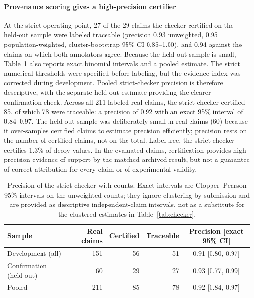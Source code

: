 \documentclass[preprint,12pt,authoryear]{elsarticle}
\begin{document}
\paragraph{Provenance scoring gives a high-precision certifier} At the strict operating point, 27 of the 29 claims the checker certified on the held-out sample were labeled traceable (precision 0.93 unweighted, 0.95 population-weighted, cluster-bootstrap 95\% CI 0.85--1.00), and 0.94 against the claims on which both annotators agree. Because the held-out sample is small, Table~\ref{tab:precision} also reports exact binomial intervals and a pooled estimate. The strict numerical thresholds were specified before labeling, but the evidence index was corrected during development. Pooled strict-checker precision is therefore descriptive, with the separate held-out estimate providing the clearer confirmation check. Across all 211 labeled real claims, the strict checker certified 85, of which 78 were traceable: a precision of 0.92 with an exact 95\% interval of 0.84--0.97. The held-out sample was deliberately small in real claims (60) because it over-samples certified claims to estimate precision efficiently; precision rests on the number of certified claims, not on the total. Label-free, the strict checker certifies 1.3\% of decoy values. In the evaluated claims, certification provides high-precision evidence of support by the matched archived result, but not a guarantee of correct attribution for every claim or of experimental validity.

\begin{table}[t]
\centering
\caption{Precision of the strict checker with counts. Exact intervals are Clopper--Pearson 95\% intervals on the unweighted counts; they ignore clustering by submission and are provided as descriptive independent-claim intervals, not as a substitute for the clustered estimates in Table~\ref{tab:checker}.}
\label{tab:precision}
\footnotesize
\begin{tabular}{@{}lrrrc@{}}
\toprule
Sample & Real claims & Certified & Traceable & Precision [exact 95\% CI]\\
\midrule
Development (all) & 151 & 56 & 51 & 0.91 [0.80, 0.97]\\
Confirmation (held-out) & 60 & 29 & 27 & 0.93 [0.77, 0.99]\\
\midrule
Pooled & 211 & 85 & 78 & 0.92 [0.84, 0.97]\\
\bottomrule
\end{tabular}
\end{table}
\end{document}
